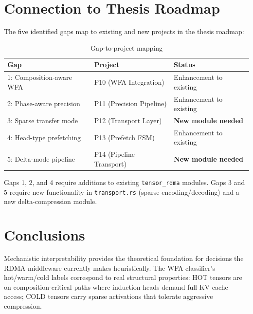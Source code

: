 \documentclass[11pt,letterpaper]{article}
\begin{document}
\section{Connection to Thesis Roadmap}
\label{sec:roadmap}

The five identified gaps map to existing and new projects in the thesis roadmap:

\begin{table}[htbp]
\centering
\caption{Gap-to-project mapping}
\label{tab:roadmap}
\begin{tabular}{@{}lll@{}}
\toprule
\textbf{Gap} & \textbf{Project} & \textbf{Status} \\
\midrule
1: Composition-aware WFA & P10 (WFA Integration) & Enhancement to existing \\
2: Phase-aware precision & P11 (Precision Pipeline) & Enhancement to existing \\
3: Sparse transfer mode & P12 (Transport Layer) & \textbf{New module needed} \\
4: Head-type prefetching & P13 (Prefetch FSM) & Enhancement to existing \\
5: Delta-mode pipeline & P14 (Pipeline Transport) & \textbf{New module needed} \\
\bottomrule
\end{tabular}
\end{table}

Gaps 1, 2, and 4 require additions to existing \texttt{tensor\_rdma} modules. Gaps 3 and 5 require new functionality in \texttt{transport.rs} (sparse encoding/decoding) and a new delta-compression module.

\section{Conclusions}
\label{sec:conclusions}

Mechanistic interpretability provides the theoretical foundation for decisions the RDMA middleware currently makes heuristically. The WFA classifier's hot/warm/cold labels correspond to real structural properties: HOT tensors are on composition-critical paths where induction heads demand full KV cache access; COLD tensors carry sparse activations that tolerate aggressive compression.
\end{document}

